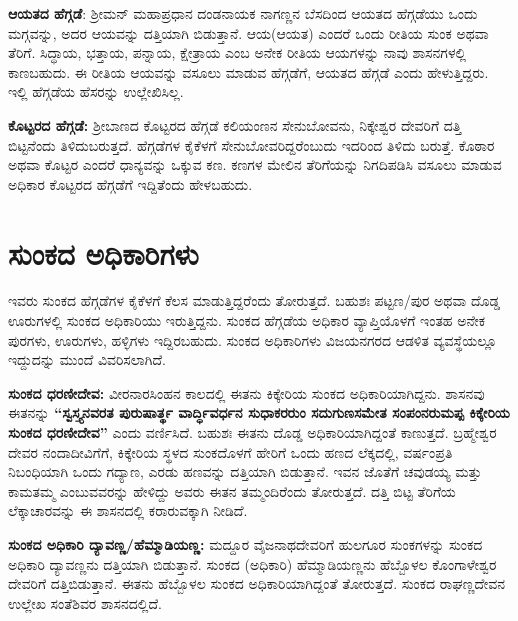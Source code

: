 \textbf{ಆಯತದ ಹೆಗ್ಗಡೆ}: ಶ‍್ರೀಮನ್​ ಮಹಾಪ್ರಧಾನ ದಂಡನಾಯಕ ನಾಗಣ್ಣನ ಬೆಸದಿಂದ ಆಯತದ ಹೆಗ್ಗಡೆಯು ಒಂದು ಮಗ್ಗವನ್ನು, ಅದರ ಆಯವನ್ನು ದತ್ತಿಯಾಗಿ ಬಿಡುತ್ತಾನೆ. ಆಯ(ಆಯತ) ಎಂದರೆ ಒಂದು ರೀತಿಯ ಸುಂಕ ಅಥವಾ ತೆರಿಗೆ. ಸಿದ್ಧಾಯ, ಭತ್ತಾಯ, ಪನ್ನಾಯ, ಕ್ಷೇತ್ರಾಯ ಎಂಬ ಅನೇಕ ರೀತಿಯ ಆಯಗಳನ್ನು ನಾವು ಶಾಸನಗಳಲ್ಲಿ ಕಾಣಬಹುದು. ಈ ರೀತಿಯ ಆಯವನ್ನು ವಸೂಲು ಮಾಡುವ ಹೆಗ್ಗಡೆಗೆ, ಆಯತದ ಹೆಗ್ಗಡೆ ಎಂದು ಹೇಳುತ್ತಿದ್ದರು. ಇಲ್ಲಿ ಹೆಗ್ಗಡೆಯ ಹೆಸರನ್ನು ಉಲ್ಲೇಖಿಸಿಲ್ಲ.

\textbf{ಕೊಟ್ಟರದ ಹೆಗ್ಗಡೆ: }ಶ‍್ರೀಬಾಣದ ಕೊಟ್ಟರದ ಹೆಗ್ಗಡೆ ಕಲಿಯಂಣನ ಸೇನುಬೋವನು, ನಿಕ್ಕೇಶ್ವರ ದೇವರಿಗೆ ದತ್ತಿ ಬಿಟ್ಟನೆಂದು ತಿಳಿದುಬರುತ್ತದೆ. ಹೆಗ್ಗಡೆಗಳ ಕೈಕೆಳಗೆ ಸೇನುಬೋವರಿದ್ದರೆಂಬುದು ಇದರಿಂದ ತಿಳಿದು ಬರುತ್ತೆ. ಕೊಠಾರ ಅಥವಾ ಕೊಟ್ಟರ ಎಂದರೆ ಧಾನ್ಯವನ್ನು ಒಕ್ಕುವ ಕಣ. ಕಣಗಳ ಮೇಲಿನ ತೆರಿಗೆಯನ್ನು ನಿಗದಿಪಡಿಸಿ ವಸೂಲು ಮಾಡುವ ಅಧಿಕಾರ ಕೊಟ್ಟರದ ಹೆಗ್ಗಡೆಗೆ ಇದ್ದಿತೆಂದು ಹೇಳಬಹುದು.

\newpage

\section*{ಸುಂಕದ ಅಧಿಕಾರಿಗಳು}

ಇವರು ಸುಂಕದ ಹೆಗ್ಗಡೆಗಳ ಕೈಕೆಳಗೆ ಕೆಲಸ ಮಾಡುತ್ತಿದ್ದರೆಂದು ತೋರುತ್ತದೆ. ಬಹುಶಃ ಪಟ್ಟಣ/ಪುರ ಅಥವಾ ದೊಡ್ಡ ಊರುಗಳಲ್ಲಿ ಸುಂಕದ ಅಧಿಕಾರಿಯು ಇರುತ್ತಿದ್ದನು. ಸುಂಕದ ಹೆಗ್ಗಡೆಯ ಅಧಿಕಾರ ವ್ಯಾಪ್ತಿಯೊಳಗೆ ಇಂತಹ ಅನೇಕ ಪುರಗಳು, ಊರುಗಳು, ಹಳ್ಳಿಗಳು ಇದ್ದಿರಬಹುದು. ಸುಂಕದ ಅಧಿಕಾರಿಗಳು ವಿಜಯನಗರದ ಆಡಳಿತ ವ್ಯವಸ್ಥೆಯಲ್ಲೂ ಇದ್ದುದನ್ನು ಮುಂದೆ ವಿವರಿಸಲಾಗಿದೆ.

\textbf{ಸುಂಕದ ಧರಣೀದೇವ:} ವೀರನಾರಸಿಂಹನ ಕಾಲದಲ್ಲಿ ಈತನು ಕಿಕ್ಕೇರಿಯ ಸುಂಕದ ಅಧಿಕಾರಿಯಾಗಿದ್ದನು. ಶಾಸನವು ಈತನನ್ನು \textbf{“ಸ್ವಸ್ತ್ಯನವರತ ಪುರುಷಾರ್ತ್ಥ ವಾರ್ದ್ಧಿವರ್ಧನ ಸುಧಾಕರರುಂ ಸದುಗುಣಸಮೇತ ಸಂಪಂನರುಮಪ್ಪ ಕಿಕ್ಕೇರಿಯ ಸುಂಕದ ಧರಣೀದೇವ”} ಎಂದು ವರ್ಣಿಸಿದೆ. ಬಹುಶಃ ಈತನು ದೊಡ್ಡ ಅಧಿಕಾರಿಯಾಗಿದ್ದಂತೆ ಕಾಣುತ್ತದೆ. ಬ್ರಹ್ಮೇಶ್ವರ ದೇವರ ನಂದಾದೀವಿಗೆಗೆ, ಕಿಕ್ಕೇರಿಯ ಸ್ಥಳದ ಸುಂಕದೊಳಗೆ ಹೇರಿಗೆ ಒಂದು ಹಣದ ಲೆಕ್ಕದಲ್ಲಿ, ವರ್ಷಂಪ್ರತಿ ನಿಬಂಧಿಯಾಗಿ ಒಂದು ಗದ್ಯಾಣ, ಎರಡು ಹಣವನ್ನು ದತ್ತಿಯಾಗಿ ಬಿಡುತ್ತಾನೆ. ಇವನ ಜೊತೆಗೆ ಚವುಡಯ್ಯ ಮತ್ತು ಕಾಮತಮ್ಮ ಎಂಬುವವರನ್ನು ಹೇಳಿದ್ದು ಅವರು ಈತನ ತಮ್ಮಂದಿರೆಂದು ತೋರುತ್ತದೆ. ದತ್ತಿ ಬಿಟ್ಟ ತೆರಿಗೆಯ ಲೆಕ್ಕಾಚಾರವನ್ನು ಈ ಶಾಸನದಲ್ಲಿ ಕರಾರುವಕ್ಕಾಗಿ ನೀಡಿದೆ.

\textbf{ಸುಂಕದ ಅಧಿಕಾರಿ ದ್ಯಾವಣ್ಣ/ಹೆಮ್ಮಾಡಿಯಣ್ಣ:} ಮದ್ದೂರ ವೈಜನಾಥದೇವರಿಗೆ ಹುಲಗೂರ ಸುಂಕಗಳನ್ನು ಸುಂಕದ ಅಧಿಕಾರಿ ದ್ಯಾವಣ್ಣನು ದತ್ತಿಯಾಗಿ ಬಿಡುತ್ತಾನೆ. ಸುಂಕದ (ಅಧಿಕಾರಿ) ಹೆಮ್ಮಾಡಿಯಣ್ಣನು ಹೆಬ್ಬೊಳಲ ಕೊಂಗಾಳೇಶ್ವರ ದೇವರಿಗೆ ದತ್ತಿಬಿಡುತ್ತಾನೆ. ಈತನು ಹೆಬ್ಬೊಳಲ ಸುಂಕದ ಅಧಿಕಾರಿಯಾಗಿದ್ದಂತೆ ತೋರುತ್ತದೆ. ಸುಂಕದ ರಾಘಣ್ಣದೇವನ ಉಲ್ಲೇಖ ಸಂತೆಶಿವರ ಶಾಸನದಲ್ಲಿದೆ.

